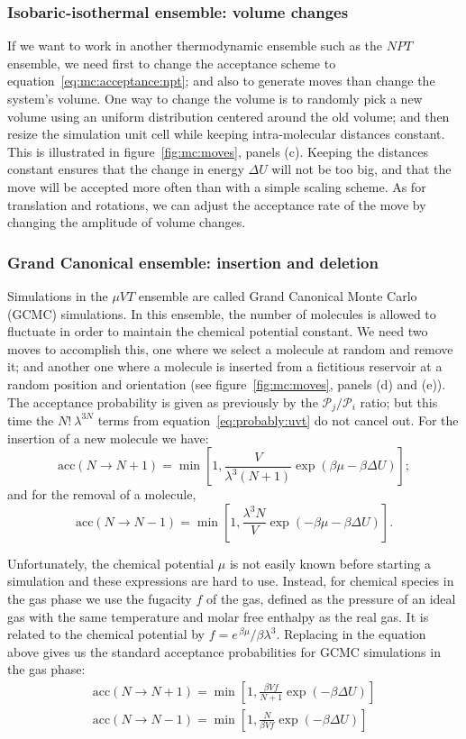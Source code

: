 \documentclass[thesis]{subfiles}
\begin{document}
\subsubsection{Isobaric-isothermal ensemble: volume changes}

If we want to work in another thermodynamic ensemble such as the $NPT$ ensemble,
we need first to change the acceptance scheme to
equation~\eqref{eq:mc:acceptance:npt}; and also to generate moves than change
the system's volume. One way to change the volume is to randomly pick a new
volume using an uniform distribution centered around the old volume; and then
resize the simulation unit cell while keeping intra-molecular distances
constant. This is illustrated in figure~\ref{fig:mc:moves}, panels (c). Keeping
the distances constant ensures that the change in energy $\Delta U$ will not be
too big, and that the move will be accepted more often than with a simple
scaling scheme. As for translation and rotations, we can adjust the acceptance
rate of the move by changing the amplitude of volume changes.

\subsubsection{Grand Canonical ensemble: insertion and deletion}

Simulations in the $\mu VT$ ensemble are called Grand Canonical Monte Carlo
(GCMC) simulations. In this ensemble, the number of molecules is allowed to
fluctuate in order to maintain the chemical potential constant. We need two
moves to accomplish this, one where we select a molecule at random and remove
it; and another one where a molecule is inserted from a fictitious reservoir at
a random position and orientation (see figure~\ref{fig:mc:moves}, panels (d) and
(e)). The acceptance probability is given as previously by the $\mathcal{P}_j /
\mathcal{P}_i$ ratio; but this time the $N!\ \lambda^{3N}$ terms from
equation~\eqref{eq:probably:uvt} do not cancel out. For the insertion of a new
molecule we have:
\[ \text{acc}(N \to N + 1) = \min\left[1, \frac{V}{\lambda^3 (N + 1)} \exp\left(\beta \mu - \beta \Delta U \right)\right]; \]
and for the removal of a molecule,
\[ \text{acc}(N \to N - 1) = \min\left[1, \frac{\lambda^3 N}{V} \exp\left(-\beta \mu - \beta \Delta U \right)\right]. \]

Unfortunately, the chemical potential $\mu$ is not easily known before starting
a simulation and these expressions are hard to use. Instead, for chemical
species in the gas phase we use the fugacity $f$ of the gas, defined as the
pressure of an ideal gas with the same temperature and molar free enthalpy as
the real gas. It is related to the chemical potential by $f = e^{\,\beta \mu} /
\beta \lambda^3$.  Replacing in the equation above gives us the standard
acceptance probabilities for GCMC simulations in the gas phase:
\begin{gather}
\text{acc}(N \to N + 1) = \min\left[1, \frac{\beta V f}{N + 1} \exp\left(- \beta \Delta U \right)\right] \\
\text{acc}(N \to N - 1) = \min\left[1, \frac{N}{\beta V f} \exp\left(- \beta \Delta U \right)\right]
\end{gather}
\end{document}

